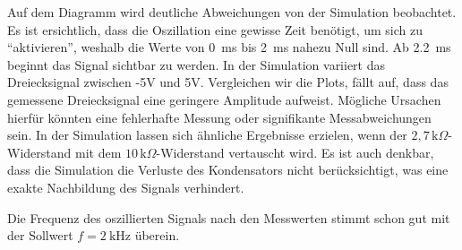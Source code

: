 Auf dem Diagramm wird deutliche Abweichungen von der Simulation beobachtet. 
Es ist ersichtlich, dass die Oszillation eine gewisse Zeit benötigt, um sich zu ``aktivieren'', 
weshalb die Werte von \SI{0}{\milli\second} bis \SI{2}{\milli\second} nahezu Null sind. Ab \SI{2,2}{\milli\second} beginnt das Signal sichtbar zu werden. 
In der Simulation variiert das Dreiecksignal zwischen -5V und 5V. Vergleichen wir die Plots, 
fällt auf, dass das gemessene Dreiecksignal eine geringere Amplitude aufweist. Mögliche Ursachen hierfür könnten 
eine fehlerhafte Messung oder signifikante Messabweichungen sein. In der Simulation lassen sich ähnliche Ergebnisse 
erzielen, wenn der \(2,7\, \text{k}\Omega\)-Widerstand mit dem \(10\, \text{k}\Omega\)-Widerstand vertauscht wird. 
 Es ist auch denkbar, dass die Simulation die Verluste des Kondensators nicht berücksichtigt, was eine exakte Nachbildung des Signals verhindert.
 

 Die Frequenz des oszillierten Signals nach den Messwerten stimmt schon gut mit der Sollwert $f=\SI{2}{\kilo\hertz}$ überein.






